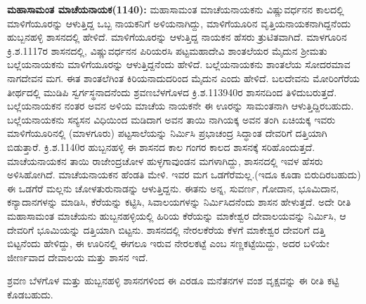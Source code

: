 \textbf{ಮಹಾಸಾಮಂತ ಮಾಚೆಯನಾಯಕ(1140):} ಮಹಾಸಾಮಂತ ಮಾಚೆಯನಾಯಕನು ವಿಷ್ಣುವರ್ಧನನ ಕಾಲದಲ್ಲಿ ಮಾಳಿಗೆಯೂರನ್ನು ಆಳುತ್ತಿದ್ದ ಒಬ್ಬ ನಾಯಕನಿಗೆ ಅಳಿಯನಾಗಿದ್ದು, ಮಾಳಿಗೆಯೂರಿನ ವೃತ್ತಿಯನಾಯಕನಾಗಿದ್ದನೆಂದು ಹುಬ್ಬನಹಳ್ಳಿ ಶಾಸನದಲ್ಲಿ ಹೇಳಿದೆ. ಮಾಳಿಗೆಯೂರನ್ನು ಆಳುತ್ತಿದ್ದ ನಾಯಕನ ಹೆಸರು ತ್ರುಟಿತವಾಗಿದೆ. ಮಾಳಗೂರಿನ ಕ್ರಿ.ಶ.1117ರ ಶಾಸನದಲ್ಲಿ, ವಿಷ್ಣುವರ್ಧನನ ಪಿರಿಯರಸಿ ಪಟ್ಟಮಹಾದೇವಿ ಶಾಂತಲೆಯರ ಮೈದುನ ಶ‍್ರೀಮತು ಬಲ್ಲೆಯ\-ನಾಯಕನು ಮಾಳಿಗೆಯೂರನ್ನು ಆಳುತ್ತಿದ್ದನೆಂದು ಹೇಳಿದೆ. ಬಲ್ಲೆಯನಾಯಕನು ಶಾಂತಲೆಯ ಸೋದರಮಾವ ನಾಗದೇವನ ಮಗ. ಈತ ಶಾಂತಲೆಗಿಂತ ಕಿರಿಯನಾದುದರಿಂದ ಮೈದುನ ಎಂದು ಹೇಳಿದೆ. ಬಲದೇವನು ಮೋರಿಂಗೆರೆಯ ತೀರ್ಥದಲ್ಲಿ ಮುಡಿಪಿ ಸ್ವರ್ಗಸ್ಥನಾದನೆಂದು ಶ್ರವಣಬೆಳಗೊಳದ ಕ್ರಿ.ಶ.1139\enginline{-}40ರ ಶಾಸನದಿಂದ ತಿಳಿದುಬರುತ್ತದೆ. ಬಲ್ಲೆಯನಾಯಕನ ನಂತರ ಅವನ ಅಳಿಯ ಮಾಚೆಯ ನಾಯಕನೇ ಈ ಊರನ್ನು ಸಾಮಂತನಾಗಿ ಆಳುತ್ತಿದ್ದಿರಬಹುದು. ಬಲ್ಲೆಯನಾಯಕನು ಸನ್ಯಸನ ವಿಧಿಯಿಂದ ಮಡಿದಾಗ ಅವನ ತಾಯಿ ನಾಗಿಯಕ್ಕ ಅವನ ತಂಗಿ ಏಚಿಯಕ್ಕ ಇವರು ಮಾಳಿಗೆಯೂರಿನಲ್ಲಿ (ಮಾಳಗೂರು) ಪಟ್ಟಸಾಲೆಯನ್ನು ನಿರ್ಮಿಸಿ ಪ್ರಭಾಚಂದ್ರ ಸಿದ್ಧಾಂತ ದೇವರಿಗೆ ದತ್ತಿಯಾಗಿ ಬಿಡುತ್ತಾರೆ. ಕ್ರಿ.ಶ.1140ರ ಹುಬ್ಬನಹಳ್ಳಿ ಈ ಶಾಸನದ ಕಾಲ ಗಂಗರ ಕಾಲದ ಶಾಸನಕ್ಕೆ ಸರಿಹೊಂದುತ್ತದೆ. ಮಾಚೆಯನಾಯಕನ ತಾಯಿ ರಾಜೇಂದ್ರಚೋಳ ಹುಳ್ಳಗಾವುಂಡನ ಮಗಳಾಗಿದ್ದು, ಶಾಸನದಲ್ಲಿ ಇವಳ ಹೆಸರು ಅಳಿಸಿಹೋಗಿದೆ. ಮಾಚೆಯನಾಯಕನ ಹೆಂಡತಿ ಮೇಳಿ. ಇವರ ಮಗ ಒಡಗೆರೆಮಲ್ಲ.(ಇದೂ ಕೂಡಾ ಬಿರುದಿರಬಹುದು) ಈ ಒಡಗೆರೆ ಮಲ್ಲನು ಚೋಳತುರುನಾಡನ್ನು ಆಳುತ್ತಿದ್ದನು. ಈತನು ಅನ್ನ, ಸುವರ್ಣ, ಗೋದಾನ, ಭೂಮಿದಾನ, ಕನ್ಯಾದಾನಗಳನ್ನು ಮಾಡಿಸಿ, ಕೆರೆಯನ್ನು ಕಟ್ಟಿಸಿ, ಸಿವಾಲಯಗಳನ್ನು ನಿರ್ಮಿಸಿದನೆಂದು ಶಾಸನ ಹೇಳುತ್ತದೆ. ಅದೇ ರೀತಿ ಮಹಾಸಾಮಂತ ಮಾಚೆಯನು ಹುಬ್ಬನಹಳ್ಳಿಯಲ್ಲಿ ಹಿರಿಯ ಕೆರೆಯನ್ನು ಮಾಕೇಶ್ವರ ದೇವಾಲಯವನ್ನು ನಿರ್ಮಿಸಿ, ಆ ದೇವರಿಗೆ ಭೂಮಿಯನ್ನು ದತ್ತಿಯಾಗಿ ಬಿಟ್ಟನು. ಶಾಸನದಲ್ಲಿ ನೇರಲಕೆರೆಯ ಕೆಳಗೆ ಮಾಕೇಶ್ವರ ದೇವರಿಗೆ ದತ್ತಿ ಬಿಟ್ಟನೆಂದು ಹೇಳಿದ್ದು, ಈ ಊರಿನಲ್ಲಿ ಈಗಲೂ ಇರುವ ನೇರಲಕಟ್ಟೆ ಎಂಬ ಸಣ್ಣಕಟ್ಟೆಯಿದ್ದು, ಅದರ ಬಳಿಯೇ ಜೀರ್ಣವಾದ ದೇವಾಲಯ ಮತ್ತು ಶಾಸನ ಇದೆ.

ಶ್ರವಣ ಬೆಳಗೊಳ ಮತ್ತು ಹುಬ್ಬನಹಳ್ಳಿ ಶಾಸನಗಳಿಂದ ಈ ಎರಡೂ ಮನೆತನಗಳ ವಂಶ ವೃಕ್ಷವನ್ನು ಈ ರೀತಿ ಕಟ್ಟಿ ಕೊಡಬಹುದು.

